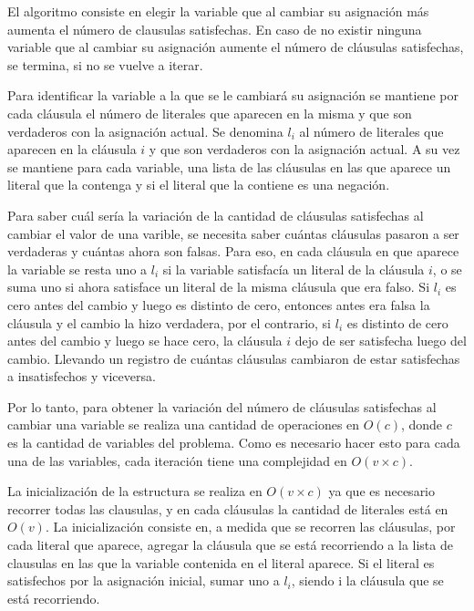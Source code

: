 \documentclass[a4paper,10pt]{article}
\begin{document}
El algoritmo consiste en elegir la variable que al cambiar su asignación más aumenta el número de clausulas satisfechas. En caso de no existir ninguna variable que al cambiar su asignación aumente el número de cláusulas satisfechas, se termina, si no se vuelve a iterar.

Para identificar la variable a la que se le cambiará su asignación se mantiene por cada cláusula el número de literales que aparecen en la misma y que son verdaderos con la asignación actual. Se denomina $l_i$ al número de literales que aparecen en la cláusula $i$ y que son verdaderos con la asignación actual. A su vez se mantiene para cada variable, una lista de las cláusulas en las que aparece un literal que la contenga y si el literal que la contiene es una negación. 

Para saber cuál sería la variación de la cantidad de cláusulas satisfechas al cambiar el valor de una varible, se necesita saber cuántas cláusulas pasaron a ser verdaderas y cuántas ahora son falsas. Para eso, en cada cláusula en que aparece la variable se resta uno a $l_i$ si la variable satisfacía un literal de la cláusula $i$, o se suma uno si ahora satisface un literal de la misma cláusula que era falso. Si $l_i$ es cero antes del cambio y luego es distinto de cero, entonces antes era falsa la cláusula y el cambio la hizo verdadera, por el contrario, si $l_i$ es distinto de cero antes del cambio y luego se hace cero, la cláusula $i$ dejo de ser satisfecha luego del cambio. Llevando un registro de cuántas cláusulas cambiaron de estar satisfechas a insatisfechos y viceversa. 


Por lo tanto, para obtener la variación del número de cláusulas satisfechas al cambiar una variable se realiza una cantidad de operaciones en $O\left( c \right)$, donde $c$ es la cantidad de variables del problema. Como es necesario hacer esto para cada una de las variables, cada iteración tiene una complejidad en $O\left( v \times c  \right)$.

La inicialización de la estructura se realiza en $O\left( v \times  c\right)$ ya que es necesario recorrer todas las clausulas, y en cada cláusulas la cantidad de literales está en $O\left( v\right)$. La inicialización consiste en, a medida que se recorren las cláusulas, por cada literal que aparece, agregar la cláusula que se está recorriendo a la lista de clausulas en las que la variable contenida en el literal aparece. Si el literal es satisfechos por la asignación inicial, sumar uno a $l_i$, siendo i la cláusula que se está recorriendo. 
\end{document}
